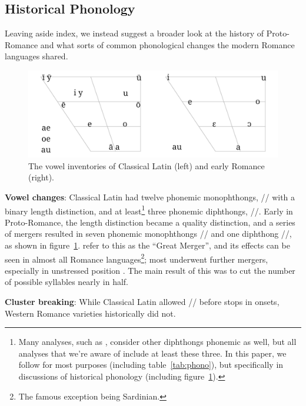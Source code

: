 \documentclass[12pt,twoside]{article}
\newcommand{\ipa}[1]{/\textipa{#1}/}
\begin{document}
\subsection{Historical Phonology}

Leaving aside  index, we instead suggest a broader look at the history of Proto-Romance and what sorts of common phonological changes the modern Romance languages shared.

\begin{figure}[h]
\centering
\caption{The vowel inventories of Classical Latin (left) and early Romance (right).}
\label{fig:vowels}
\noindent\includegraphics[width=\linewidth]{vowelchange}
\end{figure}

\textbf{Vowel changes}: Classical Latin had twelve phonemic monophthongs, \ipa{i y e a o u} with a binary length distinction, and at least\footnote{Many analyses, such as \citet{allen}, consider other diphthongs phonemic as well, but all analyses that we're aware of include at least these three. In this paper, we follow \citeauthor{allen} for most purposes (including table~\ref{tab:phono}), but \citet{alkire} specifically in discussions of historical phonology (including figure~\ref{fig:vowels}).} three phonemic diphthongs, \ipa{a\textsubarch{e} o\textsubarch{e} a\textsubarch{u}}. Early in Proto-Romance, the length distinction became a quality distinction, and a series of mergers resulted in seven phonemic monophthongs \ipa{i e E a O o u} and one diphthong \ipa{a\textsubarch{u}}, as shown in figure~\ref{fig:vowels}. \citet{alkire} refer to this as the ``Great Merger'', and its effects can be seen in almost all Romance languages\footnote{The famous exception being Sardinian.}; most underwent further mergers, especially in unstressed position \citep{alkire}. The main result of this was to cut the number of possible syllables nearly in half.

\textbf{Cluster breaking}: While Classical Latin allowed \ipa{s} before stops in onsets, Western Romance varieties historically did not.
\end{document}
